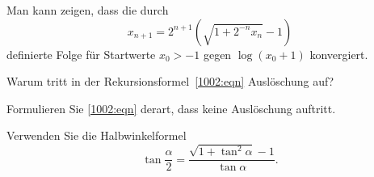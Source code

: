 Man kann zeigen, dass die durch
\begin{equation}
x_{n+1} = 2^{n+1} (\sqrt{1+2^{-n}x_n}-1)
\label{1002:eqn}
\end{equation}
definierte Folge für Startwerte $x_0>-1$ gegen $\log(x_0+1)$ konvergiert.
\begin{teilaufgaben}
\item
Warum tritt in der Rekursionsformel~\eqref{1002:eqn} Auslöschung auf?
\item
Formulieren Sie \eqref{1002:eqn} derart, dass keine Auslöschung auftritt.
\end{teilaufgaben}

\begin{hinweis}
Verwenden Sie die Halbwinkelformel
\begin{equation}
\tan\frac{\alpha}2 = \frac{\sqrt{1+\tan^2 \alpha } - 1}{\tan \alpha}.
\label{buch:1002:halbwinkel}
\end{equation}
\end{hinweis}

